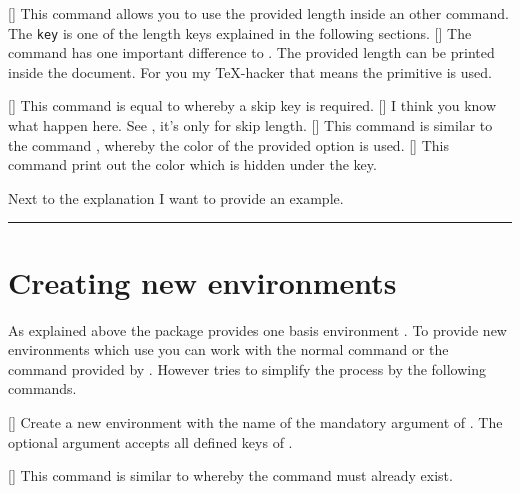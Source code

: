 \documentclass[openany,12pt,tocdepth=3]{ltx-md}
\begin{document}
[\MArgs[key]]
This command  allows you to use the
provided length inside an other command. The \texttt{key} is one of
the length keys explained in the following sections. 
[\MArgs[key]]
The command  has one important
difference to . The provided length
can be printed inside the document. For you my \TeX-hacker
that means the primitive  is used. 

[\MArgs[key]]
This command is equal to  whereby
a skip key is required.
[\MArgs[key]]
I think you know what happen here. See , 
it's only for skip length.
[\MArgs[key]]
This command is similar to the command , whereby the
color of the provided option is used.
[\MArgs[key]]
This command print out the color which is hidden under the key.

Next to the explanation I want to provide an example. 

\begin{ltxexample}[caption=Example of helper functions,label=helper,result=true,]
 \begin{xframed}[margin=3cm]
    \centering
    \rule{}{2pt}%
 \end{xframed}
\end{ltxexample}


\section{Creating new environments}\label{sec:newenv}

As explained above the package  provides
one basis environment . To provide new
environments which use  you can work with
the normal \LaTeXe command  or
the command  provided
by . However  tries to simplify
the process by the following commands.

[\OArgs{}]
Create a new environment with the name of the mandatory argument
of . The optional argument accepts all
defined keys of .

[]
This command is similar to  whereby
the command must already exist.
\end{document}
